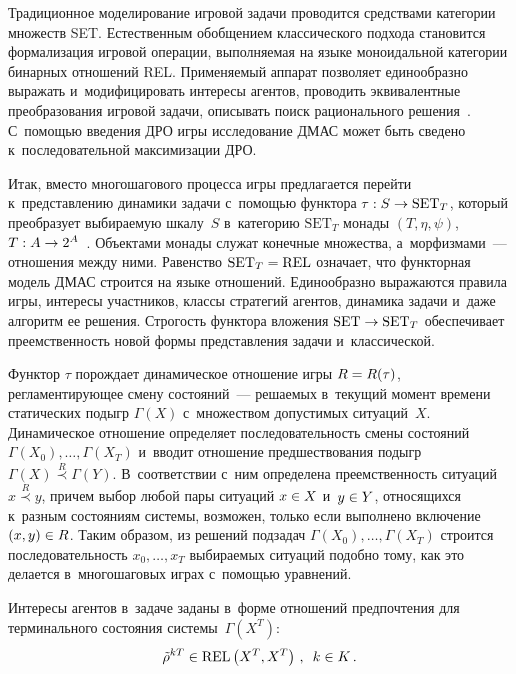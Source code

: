 \begin{multicols}{2}
    Традиционное моделирование игровой задачи проводится средствами 
категории множеств SET. Естественным обобщением классического подхода 
становится формализация игровой операции, вы\-пол\-ня\-емая на языке моноидальной 
категории бинарных отношений REL. Применяемый аппарат позволяет 
единообразно выражать и~модифицировать интересы агентов, проводить 
эквивалентные преобразования игровой задачи, описывать поиск рационального 
решения~\cite{5-vas}. С~по\-мощью введения ДРО игры исследование ДМАС может быть сведено 
к~последовательной максимизации ДРО.
    
    Итак, вместо многошагового процесса игры предлагается перейти 
    к~представлению динамики задачи с~по\-мощью функтора $\tau: S\hm\to \mathrm{SET}_T$, 
который преобразует вы\-би\-ра\-емую шкалу~$S$ в~категорию $\mathrm{SET}_T$ монады 
$(T,\eta,\psi)$, $T: A\hm\to 2^A$~\cite{11-vas}. Объектами монады служат конечные 
множества, а~морфизмами~--- отношения между ними. Равенство $\mathrm{SET}_T\hm=\mathrm{REL}$ 
означает, что функторная модель ДМАС строится на языке отношений. 
Единообразно выражаются правила игры, интересы участников, классы стратегий 
агентов, динамика задачи и~даже алгоритм ее решения. Строгость функтора 
вложения $\mathrm{SET}\hm\to \mathrm{SET}_T$ обеспечивает пре\-емст\-вен\-ность новой формы 
пред\-став\-ле\-ния задачи и~классической.
    
    Функтор $\tau$ порождает динамическое отношение игры $R\hm= R(\tau)$, 
регламентирующее смену со\-сто\-яний~--- ре\-ша\-емых в~текущий момент времени 
статических подыгр $\Gamma(X)$ с~множеством \mbox{до\-пус\-ти\-мых} ситуаций~$X$. 
Динамическое отношение определяет по\-сле\-до\-ва\-тель\-ность смены со\-сто\-яний 
$\Gamma(X_0), \ldots , \Gamma(X_T)$ и~вводит отношение предшествования подыгр 
$\Gamma(X)\overset{R}{\prec} \Gamma(Y)$. В~соответствии с~ним определена 
преемственность ситуаций $x\overset{R}{\prec} y$, причем выбор любой пары 
ситуаций $x\hm\in X$ и~$y\hm\in Y$, относящихся к~разным состояниям системы, 
возможен, только если выполнено включение $(x,y)\hm\in R$. Таким образом, из 
решений подзадач $\Gamma(X_0), \ldots , \Gamma(X_T)$ строится 
по\-сле\-до\-ва\-тель\-ность $x_0, \ldots , x_T$ вы\-би\-ра\-емых ситуаций подобно тому, как это 
делается в~многошаговых играх с~по\-мощью уравнений. 
    
    Интересы агентов в~задаче заданы в~форме отношений предпочтения для 
терминального со\-сто\-яния сис\-те\-мы~$\Gamma(X^T)$: 
    \begin{equation}
    \tilde{\rho}^{kT} \in \mathrm{REL} \left( X^T, X^T\right)\,,\enskip k\in K\,.
    \label{e1.1-vas}
    \end{equation}
    

\end{multicols}
